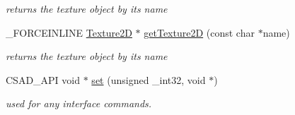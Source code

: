 \begin{DoxyCompactItemize}
\begin{DoxyCompactList}\small\item\em returns the texture object by its name \end{DoxyCompactList}\item 
\hypertarget{classcsad_1_1_graph_a18ecc20248ea21c84fa82cb4cdb1d259}{\-\_\-\-F\-O\-R\-C\-E\-I\-N\-L\-I\-N\-E \hyperlink{classcsad_1_1_texture2_d}{Texture2\-D} $\ast$ \hyperlink{classcsad_1_1_graph_a18ecc20248ea21c84fa82cb4cdb1d259}{get\-Texture2\-D} (const char $\ast$name)}\label{classcsad_1_1_graph_a18ecc20248ea21c84fa82cb4cdb1d259}

\begin{DoxyCompactList}\small\item\em returns the texture object by its name \end{DoxyCompactList}\item 
\hypertarget{classcsad_1_1_graph_a8581c2147ae1f11eaae62e491139c367}{C\-S\-A\-D\-\_\-\-A\-P\-I void $\ast$ \hyperlink{classcsad_1_1_graph_a8581c2147ae1f11eaae62e491139c367}{set} (unsigned \-\_\-int32, void $\ast$)}\label{classcsad_1_1_graph_a8581c2147ae1f11eaae62e491139c367}

\begin{DoxyCompactList}\small\item\em used for any interface commands. \end{DoxyCompactList}\end{DoxyCompactItemize}
